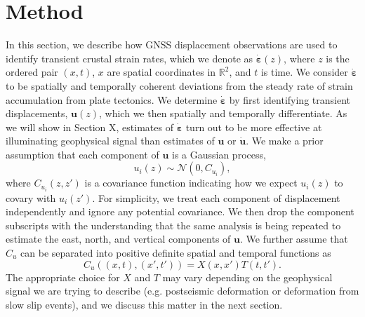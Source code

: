 \documentclass[10pt,a4paper]{article}
\begin{document}
\section{Method}\label{sec:Method}
In this section, we describe how GNSS displacement observations are used to identify transient crustal strain rates, which we denote as $\dot{\bm{\varepsilon}}(z)$, where $z$ is the ordered pair $(x,t)$, $x$ are spatial coordinates in $\mathbb{R}^2$, and $t$ is time. We consider $\dot{\bm{\varepsilon}}$ to be spatially and temporally coherent deviations from the steady rate of strain accumulation from plate tectonics. We determine $\dot{\bm{\varepsilon}}$ by first identifying transient displacements, $\bm{u}(z)$, which we then spatially and temporally differentiate.  As we will show in Section X, estimates of $\dot{\bm{\varepsilon}}$ turn out to be more effective at illuminating geophysical signal than estimates of $\bm{u}$ or $\dot{\bm{u}}$.  We make a prior assumption that each component of $\bm{u}$ is a Gaussian process,
\begin{equation}\label{eq:TransientDeformation}
u_i(z) \sim \mathcal{N}\left(0,C_{u_i}\right),
\end{equation}
where $C_{u_i}(z,z')$ is a covariance function indicating how we expect $u_i(z)$ to covary with $u_i(z')$. For simplicity, we treat each component of displacement independently and ignore any potential covariance. We then drop the component subscripts with the understanding that the same analysis is being repeated to estimate the east, north, and vertical components of $\bm{u}$. We further assume that $C_u$ can be separated into positive definite spatial and temporal functions as 
\begin{equation}\label{eq:TransientCovariance}
C_{u}\left((x,t),(x',t')\right) = X(x,x')T(t,t').
\end{equation}  
The appropriate choice for $X$ and $T$ may vary depending on the geophysical signal we are trying to describe (e.g. postseismic deformation or deformation from slow slip events), and we discuss this matter in the next section.  
\end{document}
